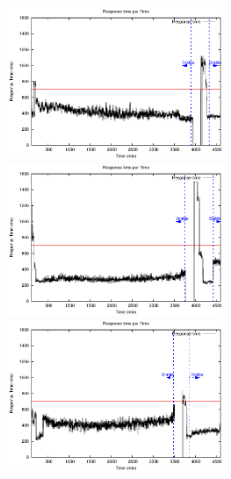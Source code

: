 \begin{figure}[htb]
	\begin{minipage}[b]{0.20\linewidth}
		\vspace{-4mm}
		\includegraphics[width=\linewidth,height=4cm]{images/exps2011/low/das/proxyDataPoints_output.eps}	
		\vspace{-4mm}
	\end{minipage}
	\hfill
\begin{minipage}[b]{0.19\linewidth}
		\vspace{-4mm}
		\includegraphics[width=\linewidth,height=4cm]{images/exps2011/medium_down/das/proxyDataPoints_output.eps}
		\vspace{-4mm}
	\end{minipage}
\hfill
	\begin{minipage}[b]{0.2\linewidth}
		\vspace{-4mm}
		\includegraphics[width=\linewidth,height=4cm]{images/exps2011/medium/das/proxyDataPoints_output.eps}
		\vspace{-4mm}
	\end{minipage}
\hfill
\begin{minipage}[b]{0.2\linewidth}

\end{minipage}
\end{figure}
